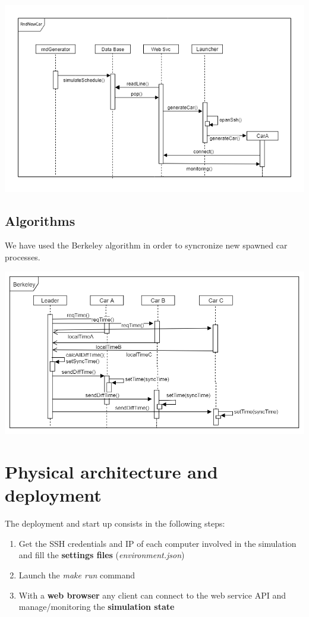 \begin{center}
    \includegraphics[scale=0.6]{assets/newCarRnd.png}
\end{center}


\subsection{Algorithms}

We have used the Berkeley algorithm in order to syncronize new spawned car processes.

\begin{center}
    \includegraphics[scale=0.6, width=\linewidth]{assets/berkeley.png}
\end{center}

\section{Physical architecture and deployment}

The deployment and start up consists in the following steps:
\begin{enumerate}
    \item Get the SSH credentials and IP of each computer involved in the simulation and 
        fill the \textbf{settings files} (\textit{environment.json})
    \item Launch the \textit{make run} command 
    \item With a \textbf{web browser} any client can connect to the web service API and 
        manage/monitoring the \textbf{simulation state}   
\end{enumerate}


